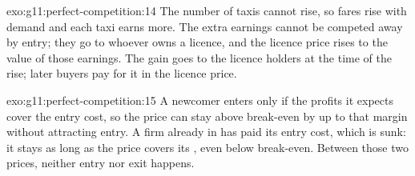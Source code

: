 \begin{solution}{exo:g11:perfect-competition:14}
The number of taxis cannot rise, so fares rise with demand and each taxi earns more. The extra earnings cannot be competed away by entry; they go to whoever owns a
licence, and the licence price rises to the value of those earnings. The gain goes to the licence holders at the time of the rise; later buyers pay for it in the
licence price.
\end{solution}

\begin{solution}{exo:g11:perfect-competition:15}
A newcomer enters only if the profits it expects cover the entry cost, so the price can stay above break-even by up to that margin without attracting entry. A firm
already in has paid its entry cost, which is sunk: it stays as long as the price covers its , even below break-even. Between those two prices,
neither entry nor exit happens.
\end{solution}

